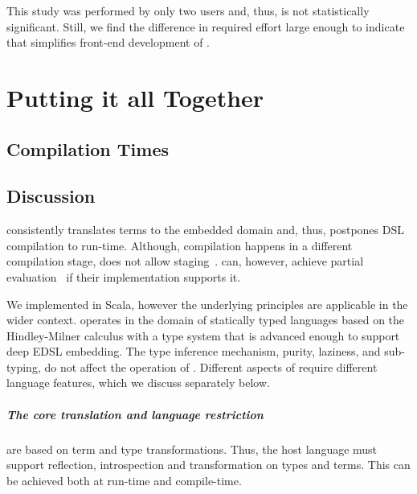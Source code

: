 This study was performed by only two users and, thus, is not statistically
significant. Still, we find the difference in required effort large enough to indicate that \yy
simplifies front-end development of \edsls.

\chapter{Putting it all Together}
\label{sec:putting-it-together}




\section{Compilation Times}
\label{sec:compilation-times}

\section{Discussion}
\label{sec:other-languages}


\yy consistently translates terms to the embedded domain and, thus, postpones
DSL compilation to run-time. Although, compilation happens in a different
compilation stage, \yy does not allow staging~\cite{taha_multi-stage_1997}.
\edsls can, however, achieve partial evaluation~\cite{jones1993partial} if their
implementation supports it.

We implemented \yy in Scala, however the underlying principles are applicable
in the wider context. \yy operates in the domain of statically typed languages
based on the Hindley-Milner calculus with a type system that is advanced enough
to support deep EDSL embedding. The type inference mechanism, purity, laziness,
and sub-typing, do not affect the operation of \yy. Different aspects of \yy
require different language features, which we discuss separately below.

\paragraph{The core translation and language restriction} are based on term and
type transformations. Thus, the host language must support reflection,
introspection and transformation on types and terms. This can be achieved both
at run-time and compile-time.

